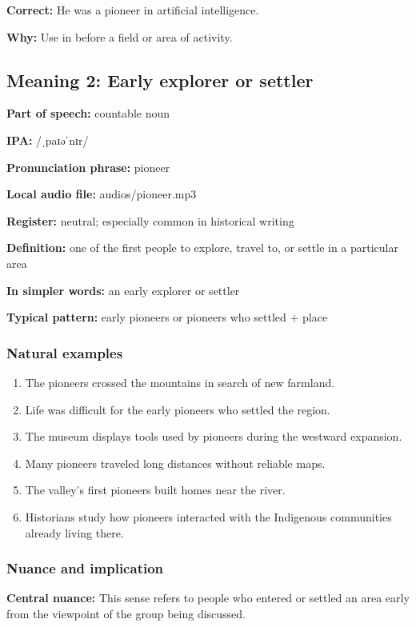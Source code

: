 \documentclass[11pt]{article}
\begin{document}
\textbf{Correct:} He was a pioneer in artificial intelligence.

\textbf{Why:} Use in before a field or area of activity.

\subsection{Meaning 2: Early explorer or settler}
\textbf{Part of speech:} countable noun

\textbf{IPA:} /ˌpaɪəˈnɪr/

\textbf{Pronunciation phrase:} pioneer

\textbf{Local audio file:} audios/pioneer.mp3

\textbf{Register:} neutral; especially common in historical writing

\textbf{Definition:} one of the first people to explore, travel to, or settle in a particular area

\textbf{In simpler words:} an early explorer or settler

\textbf{Typical pattern:} early pioneers or pioneers who settled + place

\subsubsection{Natural examples}
\begin{enumerate}
  \item The pioneers crossed the mountains in search of new farmland.
  \item Life was difficult for the early pioneers who settled the region.
  \item The museum displays tools used by pioneers during the westward expansion.
  \item Many pioneers traveled long distances without reliable maps.
  \item The valley's first pioneers built homes near the river.
  \item Historians study how pioneers interacted with the Indigenous communities already living there.
\end{enumerate}

\subsubsection{Nuance and implication}
\textbf{Central nuance:} This sense refers to people who entered or settled an area early from the viewpoint of the group being discussed.
\end{document}
